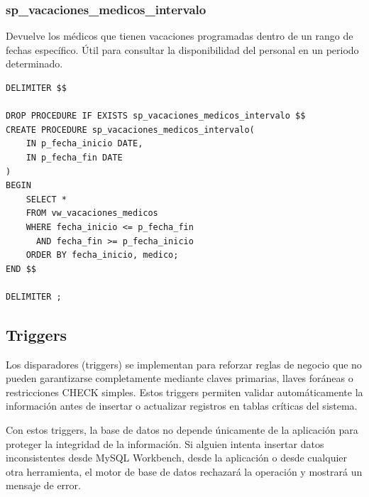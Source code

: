\documentclass[12pt,a4paper]{article}
\begin{document}
\subsubsection{sp\_vacaciones\_medicos\_intervalo}
Devuelve los m\'edicos que tienen vacaciones programadas dentro de un rango de fechas espec\'ifico. \'Util para consultar la disponibilidad del personal en un periodo determinado.

{\small\begin{verbatim}
DELIMITER $$

DROP PROCEDURE IF EXISTS sp_vacaciones_medicos_intervalo $$
CREATE PROCEDURE sp_vacaciones_medicos_intervalo(
    IN p_fecha_inicio DATE,
    IN p_fecha_fin DATE
)
BEGIN
    SELECT *
    FROM vw_vacaciones_medicos
    WHERE fecha_inicio <= p_fecha_fin
      AND fecha_fin >= p_fecha_inicio
    ORDER BY fecha_inicio, medico;
END $$

DELIMITER ;
\end{verbatim}}

\newpage

\subsection{Triggers}

Los disparadores (triggers) se implementan para reforzar reglas de negocio que no pueden garantizarse completamente mediante claves primarias, llaves foráneas o restricciones CHECK simples. Estos triggers permiten validar automáticamente la información antes de insertar o actualizar registros en tablas críticas del sistema.

Con estos triggers, la base de datos no depende únicamente de la aplicación para proteger la integridad de la información. Si alguien intenta insertar datos inconsistentes desde MySQL Workbench, desde la aplicación o desde cualquier otra herramienta, el motor de base de datos rechazará la operación y mostrará un mensaje de error.
\end{document}
